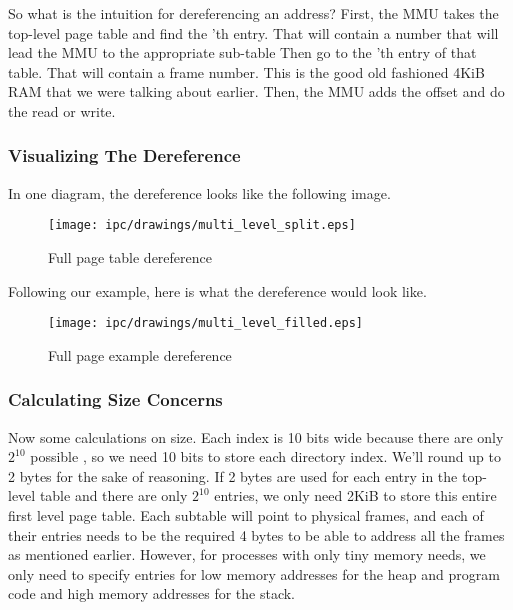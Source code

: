 	So what is the intuition for dereferencing an address?
	First, the MMU takes the top-level page table and find the 'th entry.
	That will contain a number that will lead the MMU to the appropriate sub-table
	Then go to the 'th entry of that table.
	That will contain a frame number.
	This is the good old fashioned 4KiB RAM that we were talking about earlier.
	Then, the MMU adds the offset and do the read or write.
	 
	\subsubsection{Visualizing The Dereference}
	 
	In one diagram, the dereference looks like the following image.
	 
	\begin{figure}[H]
	 \centering
	 \texttt{[image: ipc/drawings/multi\_level\_split.eps]}
	 \caption{Full page table dereference}
	\end{figure}
	 
	Following our example, here is what the dereference would look like.
	 
	\begin{figure}[H]
	 \centering
	 \texttt{[image: ipc/drawings/multi\_level\_filled.eps]}
	 \caption{Full page example dereference}
	\end{figure}
	 
	\subsubsection{Calculating Size Concerns}
	 
	Now some calculations on size.
	Each  index is 10 bits wide because there are only $2^{10}$ possible , so we need 10 bits to store each directory index.
	We'll round up to 2 bytes for the sake of reasoning.
	If 2 bytes are used for each entry in the top-level table and there are only $2^{10}$ entries, we only need 2KiB to store this entire first level page table.
	Each subtable will point to physical frames, and each of their entries needs to be the required 4 bytes to be able to address all the frames as mentioned earlier.
	However, for processes with only tiny memory needs, we only need to specify entries for low memory addresses for the heap and program code and high memory addresses for the stack.
	 
